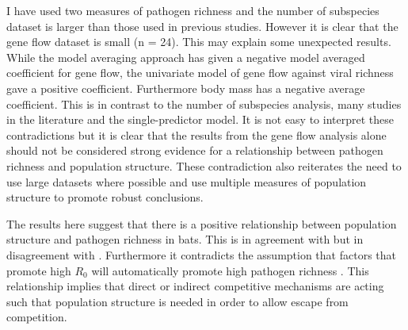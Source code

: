 I have used two measures of pathogen richness and the number of subspecies dataset is larger than those used in previous studies.
However it is clear that the gene flow dataset is small (n = 24).
This may explain some unexpected results.
While the model averaging approach has given a negative model averaged coefficient for gene flow, the univariate model of gene flow against viral richness gave a positive coefficient.
Furthermore body mass has a negative average coefficient.
This is in contrast to the number of subspecies analysis, many studies in the literature \cite{kamiya2014determines, turmelle2009correlates, gay2014parasite, maganga2014bat} and the single-predictor model.
It is not easy to interpret these contradictions but it is clear that the results from the gene flow analysis alone should not be considered strong evidence for a relationship between pathogen richness and population structure.
These contradiction also reiterates the need to use large datasets where possible and use multiple measures of population structure to promote robust conclusions.


The results here suggest that there is a positive relationship between population structure and pathogen richness in bats.
This is in agreement with \cite{maganga2014bat, turmelle2009correlates} but in disagreement with \cite{gay2014parasite}.
Furthermore it contradicts the assumption that factors that promote high $R_0$ will automatically promote high pathogen richness \cite{nunn2003comparative, morand2000wormy}.
This relationship implies that direct or indirect competitive mechanisms are acting such that population structure is needed in order to allow escape from competition.

